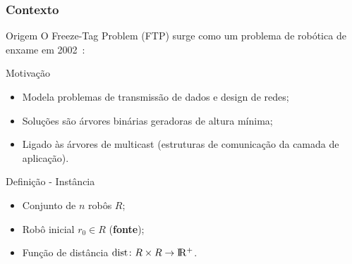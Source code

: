 
\subsubsection{Contexto}

\stopcounter
\begin{frame}{Origem}
  O Freeze-Tag Problem (FTP) surge como um problema de robótica de enxame em 2002~\cite{Arkin02}:
  \bigbreak
  \begin{minipage}{\linewidth}
    \centering
  \end{minipage}
\end{frame}
\inccounter

\begin{frame}{Motivação}
  \begin{itemize}[<+->]

    \item Modela problemas de transmissão de dados e design de redes;

    \item Soluções são árvores binárias geradoras de altura mínima;

    \item Ligado às árvores de multicast (estruturas de comunicação da camada de aplicação).

  \end{itemize}
\end{frame}

\begin{frame}{Definição - Instância}
  \begin{itemize}[<+->]

    \item Conjunto de $n$ robôs $R$;

    \item Robô inicial $r_0 \in R$ (\textbf{fonte});

    \item Função de distância $\text{dist}\colon R\times R \to \rm I\!R^+$.

  \end{itemize}
\end{frame}

